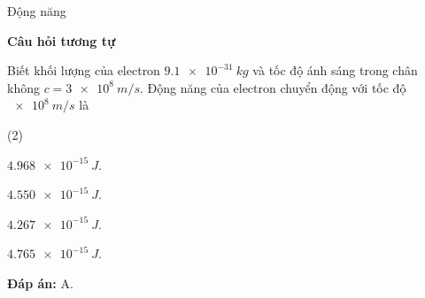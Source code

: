 \begin{dang}{Động năng}
{		\begin{center}
			\textbf{Câu hỏi tương tự}
		\end{center}
		
		Biết khối lượng của electron $ \SI{9,1 e-31}{kg} $ và tốc độ ánh sáng trong chân không $ c = \SI{3 e8}{m/s} $. Động năng của electron chuyển động với tốc độ $ \SI{e8}{m/s} $ là
		\begin{mcq}(2)
			\item $ \SI{4,968 e-15}{J} $.
			\item $ \SI{4,550 e-15}{J} $.
			\item $ \SI{4,267 e-15}{J} $.
			\item $ \SI{4,765 e-15}{J} $.
		\end{mcq}
		\textbf{Đáp án:} A.
	}


\end{dang}

